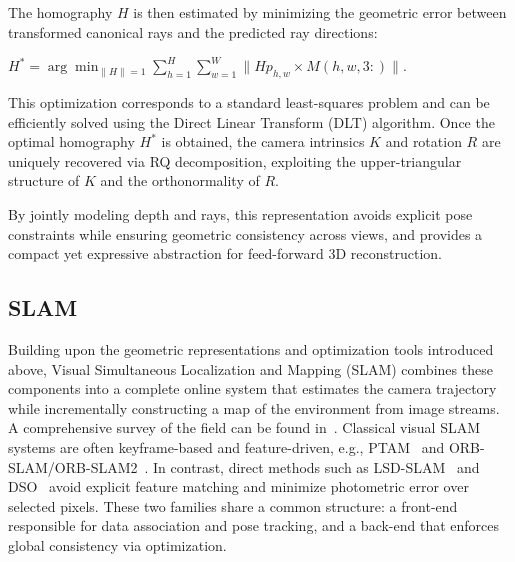 The homography $H$ is then estimated by minimizing the geometric error between transformed canonical rays and the predicted ray directions:
\begin{center}
    $\displaystyle H^* = \arg \min_{\|H\|=1} \sum_{h=1}^{H} \sum_{w=1}^{W} \| H p_{h,w} \times M(h,w,3:) \|. $
\end{center}
This optimization corresponds to a standard least-squares problem and can be efficiently solved using the Direct Linear Transform (DLT) algorithm. Once the optimal homography $H^*$ is obtained, the camera intrinsics $K$ and rotation $R$ are uniquely recovered via RQ decomposition, exploiting the upper-triangular structure of $K$ and the orthonormality of $R$.

By jointly modeling depth and rays, this representation avoids explicit pose constraints while ensuring geometric consistency across views, and provides a compact yet expressive abstraction for feed-forward 3D reconstruction.

\subsection{SLAM}
\label{sec:slam_theory}
\label{sec:slam_and_optimization}
Building upon the geometric representations and optimization tools introduced above, Visual Simultaneous Localization and Mapping (SLAM) combines these components into a complete online system that estimates the camera trajectory while incrementally constructing a map of the environment from image streams. A comprehensive survey of the field can be found in~\cite{cadena2016slam}. Classical visual SLAM systems are often keyframe-based and feature-driven, e.g., PTAM~\cite{klein2007ptam} and ORB-SLAM/ORB-SLAM2~\cite{murartal2015orbslam,murartal2017orbslam2}. In contrast, direct methods such as LSD-SLAM~\cite{engel2014lsdslam} and DSO~\cite{engel2018dso} avoid explicit feature matching and minimize photometric error over selected pixels. These two families share a common structure: a front-end responsible for data association and pose tracking, and a back-end that enforces global consistency via optimization.

